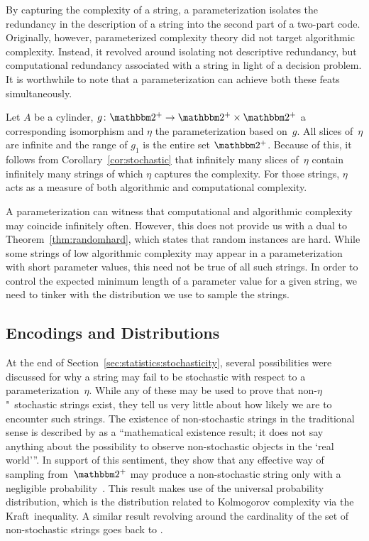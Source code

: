 \begin{example}
\label{ex:simultaneous}%
  By capturing the complexity of a string, a parameterization isolates the redundancy in the description of a string into the second part of a two-part code.
  Originally, however, parameterized complexity theory did not target algorithmic complexity.
  Instead, it revolved around isolating not descriptive redundancy, but computational redundancy associated with a string in light of a decision problem.
  It is worthwhile to note that a parameterization can achieve both these feats simultaneously.

  Let $A$ be a \pdash{}cylinder, $g\colon \binary^+ \to \binary^+ \times \binary^+$ a corresponding isomorphism and $\eta$ the parameterization based on~$g$.
  All slices of~$\eta$ are infinite and the range of $g_1$ is the entire set $\binary^+$.
  Because of this, it follows from Corollary~\ref{cor:stochastic} that infinitely many slices of~$\eta$ contain infinitely many strings of which $\eta$ captures the complexity.
  For those strings, $\eta$ acts as a measure of both algorithmic and computational complexity.
\end{example}

A parameterization can witness that computational and algorithmic complexity may coincide infinitely often.
However, this does not provide us with a dual to Theorem~\ref{thm:randomhard}, which states that random instances are hard.
While some strings of low algorithmic complexity may appear in a parameterization with short parameter values, this need not be true of all such strings.
In order to control the expected minimum length of a parameter value for a given string, we need to tinker with the distribution we use to sample the strings.

\subsection{Encodings and Distributions}
\label{sec:statistics:encodings_distributions}%
At the end of Section~\ref{sec:statistics:stochasticity}, several possibilities were discussed for why a string may fail to be stochastic with respect to a parameterization~$\eta$.
While any of these may be used to prove that non-$\eta$"~stochastic strings exist, they tell us very little about how likely we are to encounter such strings.
The existence of non-stochastic strings in the traditional sense is described by \citeauthor{vereshchagin2017algorithmic} as a \enquote{mathematical existence result; it does not say anything about the possibility to observe non-stochastic objects in the \enquote{real world}}.
In support of this sentiment, they show that any effective way of sampling from~$\binary^+$ may produce a non-stochastic string only with a negligible probability~\parencite{muchnik1998mathematical,vereshchagin2017algorithmic}.
This result makes use of the universal probability distribution, which is the distribution related to Kolmogorov complexity via the Kraft~inequality.
A similar result revolving around the cardinality of the set of non-stochastic strings goes back to \textcite[Theorem~3]{shen1983concept}.

